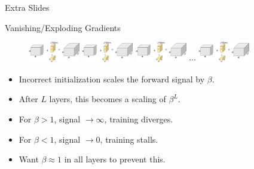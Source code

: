 \documentclass[t,xcolor=dvipsnames]{beamer}
\begin{document}
\begin{frame}{}
\centering
Extra Slides
\end{frame}

\begin{frame}{Vanishing/Exploding Gradients}{}
\vspace{-2em}
\begin{figure}
    \includegraphics[width=0.2\textwidth, page=1, bb = 0 0 440 600, clip=true]{../Figs/PDF/sparsification}
    \includegraphics[width=0.2\textwidth, page=1, bb = 0 0 440 600, clip=true]{../Figs/PDF/sparsification}
    \includegraphics[width=0.2\textwidth, page=1, bb = 0 0 440 600, clip=true]{../Figs/PDF/sparsification}
    $\cdots$
    \includegraphics[width=0.2\textwidth, page=1, bb = 0 0 400 600, clip=true]{../Figs/PDF/sparsification}
\end{figure}

\begin{itemize}
    \item Incorrect initialization scales the forward signal by $\beta$.
    \item After $L$ layers, this becomes a scaling of $\beta^L$.
    \item For \alert{$\beta > 1$}, signal $\rightarrow\infty$, training \alert{diverges}.
    \item For \alert{$\beta < 1$}, signal $\rightarrow 0$, training \alert{stalls}.
    \item Want $\beta\approx 1$ in all layers to prevent this.
\end{itemize}
\end{frame}
\end{document}
